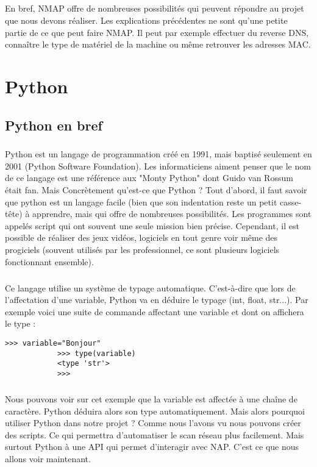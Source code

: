 \documentclass[12pt]{report}
\begin{document}
			\paragraph{}
				En bref, NMAP offre de nombreuses possibilités qui peuvent répondre au projet que nous devons réaliser. Les explications précédentes ne sont qu'une petite partie de ce que peut faire NMAP. Il peut par exemple effectuer du reverse DNS, connaître le type de matériel de la machine ou même retrouver les adresses MAC.
	\chapter{Python}
		\section{Python en bref}
			\paragraph{}
				Python est un langage de programmation créé en 1991, mais baptisé seulement en 2001 (Python Software Foundation). Les informaticiens aiment penser que le nom de ce langage est une référence aux "Monty Python" dont Guido van Rossum était fan. Mais Concrètement qu'est-ce que Python ? Tout d'abord, il faut savoir que python est un langage facile (bien que son indentation reste un petit casse-tête) à apprendre, mais qui offre de nombreuses possibilités. Les programmes sont appelés script qui ont souvent une seule mission bien précise. Cependant, il est possible de réaliser des jeux vidéos, logiciels en tout genre voir même des progiciels (souvent utilisés par les professionnel, ce sont plusieurs logiciels fonctionnant ensemble).
			\paragraph{}
				Ce langage utilise un système de typage automatique. C'est-à-dire que lors de l'affectation d'une variable, Python va en déduire le typage (int, float, str...). Par exemple voici une suite de commande affectant une variable et dont on affichera le type :
				\begin{lstlisting}[caption=Affectation variable en Python, captionpos=b]
			>>> variable="Bonjour"
			>>> type(variable)
			<type 'str'>
			>>>
				\end{lstlisting}
			\paragraph{}
				Nous pouvons voir sur cet exemple que la variable est affectée à une chaîne de caractère. Python déduira alors son type automatiquement. Mais alors pourquoi utiliser Python dans notre projet ? Comme nous l'avons vu nous pouvons créer des scripts. Ce qui permettra d'automatiser le scan réseau plus facilement. Mais surtout Python à une API qui permet d'interagir avec NAP. C'est ce que nous allons voir maintenant.
\end{document}
